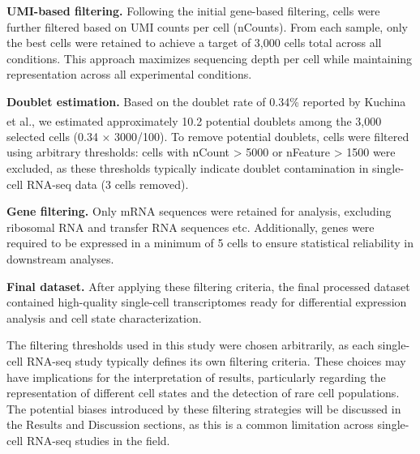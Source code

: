 \documentclass[
  11pt,
  a4paper,
]{report}
\begin{document}
\textbf{UMI-based filtering.} Following the initial gene-based
filtering, cells were further filtered based on UMI counts per cell
(nCounts). From each sample, only the best cells were retained to
achieve a target of 3,000 cells total across all conditions. This
approach maximizes sequencing depth per cell while maintaining
representation across all experimental conditions.

\textbf{Doublet estimation.} Based on the doublet rate of 0.34\%
reported by Kuchina et
al.\textsuperscript{}, we estimated
approximately 10.2 potential doublets among the 3,000 selected cells
(0.34 × 3000/100). To remove potential doublets, cells were filtered
using arbitrary thresholds: cells with nCount \textgreater{} 5000 or
nFeature \textgreater{} 1500 were excluded, as these thresholds
typically indicate doublet contamination in single-cell RNA-seq data (3
cells removed).

\textbf{Gene filtering.} Only mRNA sequences were retained for analysis,
excluding ribosomal RNA and transfer RNA sequences etc. Additionally,
genes were required to be expressed in a minimum of 5 cells to ensure
statistical reliability in downstream analyses.

\textbf{Final dataset.} After applying these filtering criteria, the
final processed dataset contained high-quality single-cell
transcriptomes ready for differential expression analysis and cell state
characterization.

\begin{tcolorbox}[enhanced jigsaw, colbacktitle=quarto-callout-warning-color!10!white, bottomtitle=1mm, coltitle=black, colframe=quarto-callout-warning-color-frame, left=2mm, bottomrule=.15mm, rightrule=.15mm, opacityback=0, toptitle=1mm, colback=white, title=\textcolor{quarto-callout-warning-color}{\faExclamationTriangle}\hspace{0.5em}{Warning}, arc=.35mm, toprule=.15mm, breakable, leftrule=.75mm, opacitybacktitle=0.6, titlerule=0mm]

The filtering thresholds used in this study were chosen arbitrarily, as
each single-cell RNA-seq study typically defines its own filtering
criteria. These choices may have implications for the interpretation of
results, particularly regarding the representation of different cell
states and the detection of rare cell populations. The potential biases
introduced by these filtering strategies will be discussed in the
Results and Discussion sections, as this is a common limitation across
single-cell RNA-seq studies in the field.

\end{tcolorbox}
\end{document}
